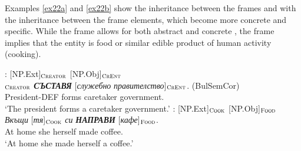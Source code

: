 \documentclass[output=paper,colorlinks,citecolor=brown]{langscibook}
\begin{document}
Examples \ref{ex22a} and \ref{ex22b} show the inheritance between the frames  and  with the inheritance between the frame elements, which become more concrete and specific. While the frame  allows for both abstract and concrete , the frame  implies that the entity is food or similar edible product of human activity (cooking).

 \begin{exe}
 \ex
 \begin{xlist}
\ex \label{ex22a} : [NP.Ext]$_{\text{\textsc{Creator}}}$ [NP.Obj]$_{\text{\textsc{CrEnt}}}$ \\
$_{\text{\textsc{Creator}}}$ \textit{\textbf{СЪСТАВЯ}} [\textit{служебно} \textit{правителство}]$_{\text{\textsc{CrEnt}}}$.  (BulSemCor)\\
President-DEF forms caretaker government. {}\\
\glt `The president forms a caretaker government.'
\ex \label{ex22b}  : [NP.Ext]$_{\text{\textsc{Cook}}}$ [NP.Obj]$_{\text{\textsc{Food}}}$ \\
\gll \textit{Вкъщи} [\textit{тя}]$_{\text{\textsc{Cook}}}$ \textit{си} \textit{\textbf{НАПРАВИ}} [\textit{кафе}]$_{\text{\textsc{Food}}}$.   \\
{At home} she herself made coffee. \\
\glt `At home she made herself a coffee.'
 \end{xlist}
 \end{exe}

\end{document}
